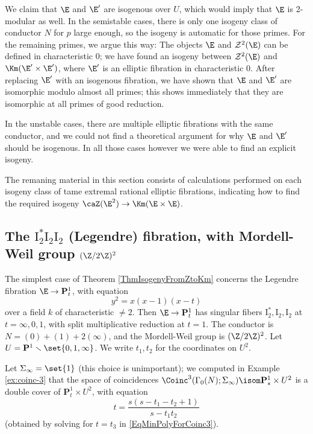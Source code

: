 \documentclass{article}
\def\P{\mathbf{P}}
\newcommand{\I}{\mathrm{I}}
\begin{document}
We claim that $\E$ and $\E'$ are isogenous over $U$, which would imply that $\E$ is 2-modular as well.  In the semistable cases, there is only one isogeny class of 
conductor $N$ for $p$ large enough, so the isogeny is automatic for those primes.  For the remaining primes, we argue this way:  The objects $\E$ and  $\mathcal{Z}^2(\E)$ can be defined in characteristic 0;  we have found an isogeny between $\mathcal{Z}^2(\E)$ and $\Km(\E'\times\E')$, where $\E'$ is an elliptic fibration in characteristic 0.  After replacing $\E'$ with an isogenous fibration, we have shown that $\E$ and $\E'$ are isomorphic modulo almost all primes;  this shows immediately that they are isomorphic at all primes of good reduction.  

In the unstable cases, there are multiple elliptic fibrations with the same conductor, and we could not find a theoretical argument for why $\E$ and $\E'$ should be isogenous.  In all those cases however we were able to find an explicit isogeny.  

The remaning material in this section consists of calculations performed on each isogeny class of tame extremal rational elliptic fibrations, indicating how to find the required isogeny $\caZ(\E^2)\to \Km(\E\times\E)$. 


\subsection{The $\I_2^\ast\I_2\I_2$ (Legendre) fibration, with Mordell-Weil group $(\Z/2\Z)^2$}

The simplest case of Theorem \ref{ThmIsogenyFromZtoKm} concerns the Legendre fibration $\E\to\P^1_t$, with equation
\begin{equation}
\label{EqLegendre}
 y^2=x(x-1)(x-t) 
\end{equation}
over a field $k$ of characteristic $\neq 2$.  Then $\E\to \P^1_t$ has singular fibers $\I_2^*,\I_2,\I_2$ at $t=\infty,0,1$, with split multiplicative reduction at $t=1$.  The conductor is $N=(0)+(1)+2(\infty)$, and the Mordell-Weil group is $(\Z/2\Z)^2$.  Let $U=\P^1\smallsetminus \set{0,1,\infty}$.   We write $t_1,t_2$ for the coordinates on $U^2$.

Let $\Sigma_\infty=\set{1}$ (this choice is unimportant);  we computed in Example \ref{ex:coinc-3} that the space of coincidences $\Coinc^3(\Gamma_0(N);\Sigma_\infty)\isom \P^1_s\times U^2$ is a double cover of $\P^1_t\times U^2$, with equation
\begin{equation}
\label{EqTInTermsOfS}
 t = \frac{s(s-t_1-t_2+1)}{s-t_1t_2} 
 \end{equation}
 (obtained by solving for $t=t_3$ in \eqref{EqMinPolyForCoinc3}).  
\end{document}
